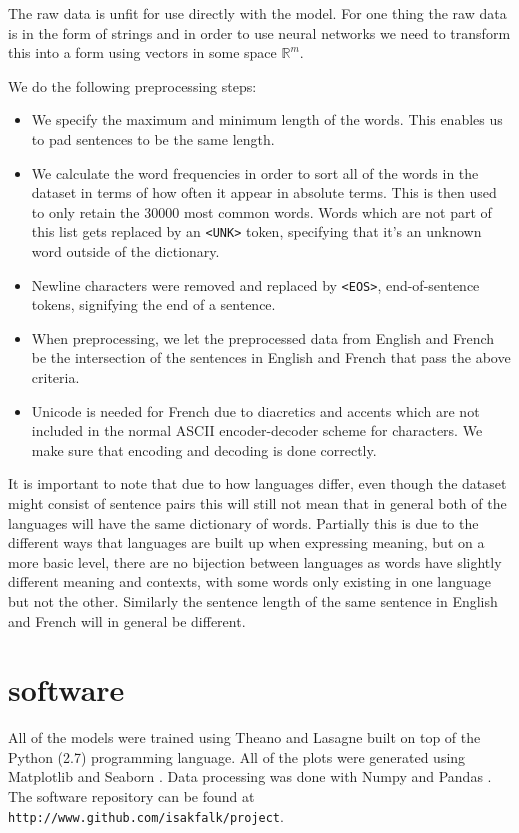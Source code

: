 The raw data is unfit for use directly with the model. For one thing the raw
data is in the form of strings and in order to use neural networks we need to
transform this into a form using vectors in some space $\mathbb{R}^m$.

We do the following preprocessing steps:

\begin{itemize}
\item We specify the maximum and minimum length of the words. This enables us to
  pad sentences to be the same length.
\item We calculate the word frequencies in order to sort all of the words in the
  dataset in terms of how often it appear in absolute terms. This is then used
  to only retain the 30000 most common words. Words which are not part of this
  list gets replaced by an \texttt{<UNK>} token, specifying that it's an unknown
  word outside of the dictionary.
\item Newline characters were removed and replaced by \texttt{<EOS>},
  end-of-sentence tokens, signifying the end of a sentence.
\item When preprocessing, we let the preprocessed data from English and French
  be the intersection of the sentences in English and French that pass the above
  criteria.
\item Unicode is needed for French due to diacretics and accents which are not
  included in the normal ASCII encoder-decoder scheme for characters. We make
  sure that encoding and decoding is done correctly.
\end{itemize}

It is important to note that due to how languages differ, even though the
dataset might consist of sentence pairs this will still not mean that in general
both of the languages will have the same dictionary of words. Partially this is
due to the different ways that languages are built up when expressing meaning,
but on a more basic level, there are no bijection between languages as words
have slightly different meaning and contexts, with some words only existing in
one language but not the other. Similarly the sentence length of the same
sentence in English and French will in general be different.

\section{software}
All of the models were trained using Theano \cite{2016arXiv160502688short} and Lasagne \cite{lasagne} built on
top of the Python (2.7) programming language. All of the plots were
generated using Matplotlib \cite{Hunter:2007} and Seaborn \cite{michael_waskom_2014_12710}. Data processing was done with Numpy
\cite{Walt:2011:NAS:1957373.1957466} and Pandas \cite{mckinney-proc-scipy-2010}. The software repository can be found at \texttt{http://www.github.com/isakfalk/project}.

